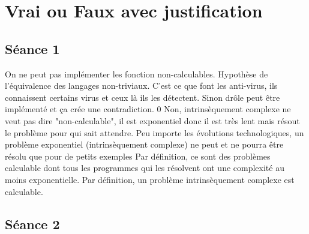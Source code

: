 \chapter{Vrai ou Faux avec justification}

\section*{Séance 1}

\begin{mcqs}
  {On ne peut pas implémenter les fonction non-calculables.}
  {Hypothèse de l'équivalence des langages non-triviaux.}
  {C'est ce que font les anti-virus, ils connaissent certains virus et ceux là ils les détectent.}
  {Sinon drôle peut être implémenté et ça crée une contradiction.}
  {0}
  {Non, intrinsèquement complexe ne veut pas dire "non-calculable", il est exponentiel donc il est très lent mais résout le problème pour qui sait attendre.}
  {Peu importe les évolutions technologiques, un problème exponentiel (intrinsèquement complexe) ne peut et ne pourra être résolu que pour de petits exemples}
  {Par définition, ce sont des problèmes calculable dont tous les programmes qui les résolvent ont une complexité au moins exponentielle.}
  {Par définition, un problème intrinsèquement complexe est calculable.}
\end{mcqs}

\section*{Séance 2}


